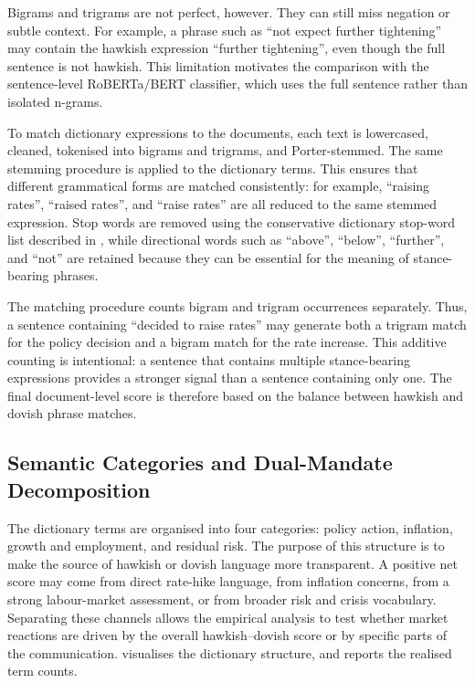 Bigrams and trigrams are not perfect, however. They can still miss
negation or subtle context. For example, a phrase such as ``not
expect further tightening'' may contain the hawkish expression
``further tightening'', even though the full sentence is not
hawkish. This limitation motivates the comparison with the
sentence-level RoBERTa/BERT classifier, which uses the full sentence
rather than isolated n-grams.

To match dictionary expressions to the documents, each text is
lowercased, cleaned, tokenised into bigrams and trigrams, and
Porter-stemmed. The same stemming procedure is applied to the
dictionary terms. This ensures that different grammatical forms are
matched consistently: for example, ``raising rates'', ``raised
rates'', and ``raise rates'' are all reduced to the same stemmed
expression. Stop words are removed using the conservative dictionary
stop-word list described in , while
directional words such as ``above'', ``below'', ``further'', and
``not'' are retained because they can be essential for the meaning
of stance-bearing phrases.

The matching procedure counts bigram and trigram occurrences
separately. Thus, a sentence containing ``decided to raise rates''
may generate both a trigram match for the policy decision and a
bigram match for the rate increase. This additive counting is
intentional: a sentence that contains multiple stance-bearing
expressions provides a stronger signal than a sentence containing
only one. The final document-level score is therefore based on the
balance between hawkish and dovish phrase matches.


\subsection{Semantic Categories and Dual-Mandate Decomposition}
\label{sec:meth_dict_categories}
\label{sec:meth_dual_mandate}

The dictionary terms are organised into four categories: policy
action, inflation, growth and employment, and residual risk. The
purpose of this structure is to make the source of hawkish or
dovish language more transparent. A positive net score may come
from direct rate-hike language, from inflation concerns, from a
strong labour-market assessment, or from broader risk and crisis
vocabulary. Separating these channels allows the empirical analysis
to test whether market reactions are driven by the overall
hawkish--dovish score or by specific parts of the communication.
 visualises the dictionary structure, and
 reports the realised term counts.

